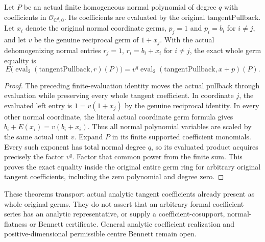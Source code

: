 \begin{theorem}
\label{hir:actual-normal-unit-analytic-coefficient-dictionary}
Let $P$ be an actual finite homogeneous normal polynomial of degree
$q$ with coefficients in $\mathcal O_{\mathbb C^d,0}$. Its coefficients
are evaluated by the original $\mathrm{tangentPullback}$. Let $x_i$
denote the original normal coordinate germs, $p_j=1$ and $p_i=b_i$
for $i\ne j$, and let $v$ be the genuine reciprocal germ of
$1+x_j$. With the actual dehomogenizing normal entries $r_j=1$,
$r_i=b_i+x_i$ for $i\ne j$, the exact whole germ equality is
\[
 E\bigl(\operatorname{eval}_2(\mathrm{tangentPullback},r)(P)\bigr)
 =v^q\operatorname{eval}_2(\mathrm{tangentPullback},x+p)(P).
\]
\leanok
\end{theorem}
\begin{proof}
The preceding finite-evaluation identity moves the actual pullback
through evaluation while preserving every whole tangent coefficient.
In coordinate $j$, the evaluated left entry is $1=v(1+x_j)$ by
the genuine reciprocal identity. In every other normal coordinate,
the literal actual coordinate germ formula gives
$b_i+E(x_i)=v(b_i+x_i)$. Thus all normal polynomial variables are
scaled by the same actual unit $v$. Expand $P$ in its finite supported
coefficient monomials. Every such exponent has total normal degree
$q$, so its evaluated product acquires precisely the factor $v^q$.
Factor that common power from the finite sum. This proves the exact
equality inside the original entire germ ring for arbitrary original
tangent coefficients, including the zero polynomial and degree zero.
\end{proof}

These theorems transport actual analytic tangent coefficients already
present as whole original germs. They do not assert that an arbitrary
formal coefficient series has an analytic representative, or supply a
coefficient-cosupport, normal-flatness or Bennett certificate. General
analytic coefficient realization and positive-dimensional permissible
centre Bennett remain open.
